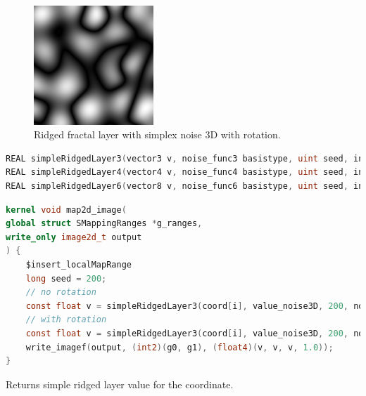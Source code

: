 \begin{figure}[h]
\centering
\includegraphics[width=0.4\textwidth]{out/simpleRidgedLayer3/simpleRidgedLayer3_simplex_noise3D_noInterp_rot.png}
\caption{Ridged fractal layer with simplex noise 3D with rotation.}
\label{fig:ridged_fractal_layer3_simplex_noise3D_noInterp_rot}
\end{figure}

\begin{lstlisting}[caption={Definition of ridged fractal layer functions},label={lst:ridged_fractal_layer_definition},language=OpenCL]
REAL simpleRidgedLayer3(vector3 v, noise_func3 basistype, uint seed, interp_func interp, REAL layerscale, REAL layerfreq, bool rot, REAL angle, REAL ax, REAL ay, REAL az);
REAL simpleRidgedLayer4(vector4 v, noise_func4 basistype, uint seed, interp_func interp, REAL layerscale, REAL layerfreq, bool rot, REAL angle, REAL ax, REAL ay, REAL az);
REAL simpleRidgedLayer6(vector8 v, noise_func6 basistype, uint seed, interp_func interp, REAL layerscale, REAL layerfreq, bool rot, REAL angle, REAL ax, REAL ay, REAL az);
\end{lstlisting}

\begin{lstlisting}[caption={Example for ridged fractal layer functions},label={lst:ridged_fractal_layer_example},language=OpenCL]
kernel void map2d_image(
global struct SMappingRanges *g_ranges,
write_only image2d_t output
) {
    $insert_localMapRange
    long seed = 200;
    // no rotation
    const float v = simpleRidgedLayer3(coord[i], value_noise3D, 200, noInterp, 1, 0.125, false, 0.0, 0.0, 0.0, 0.0);
    // with rotation
    const float v = simpleRidgedLayer3(coord[i], value_noise3D, 200, noInterp, 1, 0.125, true, 1.57, 1.0, 0.0, 0.0);
    write_imagef(output, (int2)(g0, g1), (float4)(v, v, v, 1.0));
}
\end{lstlisting}

Returns simple ridged layer value for the coordinate.

